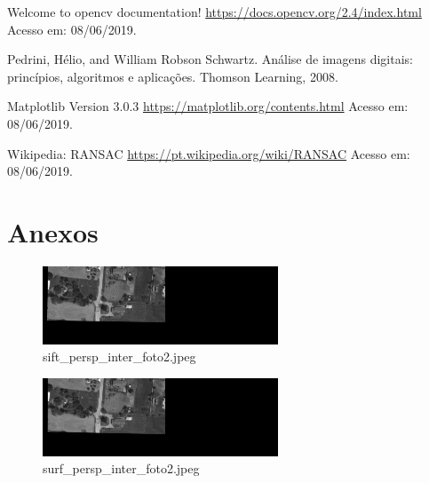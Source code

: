 \documentclass[twoside,twocolumn]{article}
\begin{document}

\begin{thebibliography}{99} %

 Welcome to opencv documentation! \href{https://docs.opencv.org/2.4/index.html}{https://docs.opencv.org/2.4/index.html} Acesso em: 08/06/2019.

 Pedrini, Hélio, and William Robson Schwartz. Análise de imagens digitais: princípios, algoritmos e aplicações. Thomson Learning, 2008.

 Matplotlib Version 3.0.3 \href{https://matplotlib.org/contents.html}{https://matplotlib.org/contents.html} Acesso em: 08/06/2019.

 Wikipedia: RANSAC \href{https://pt.wikipedia.org/wiki/RANSAC}{https://pt.wikipedia.org/wiki/RANSAC} Acesso em: 08/06/2019.
 
\end{thebibliography}


\section*{Anexos}

\begin{figure}[H]
\begin{center}
	\includegraphics[width=7cm]{figures/sift_persp_inter_foto2.jpeg}
\caption{sift\_persp\_inter\_foto2.jpeg} \label{sift_persp_inter_foto2}
\end{center}
\end{figure}

\begin{figure}[H]
\begin{center}
	\includegraphics[width=7cm]{figures/surf_persp_inter_foto2.jpeg}
\caption{surf\_persp\_inter\_foto2.jpeg} \label{surf_persp_inter_foto2}
\end{center}
\end{figure}
\end{document}
